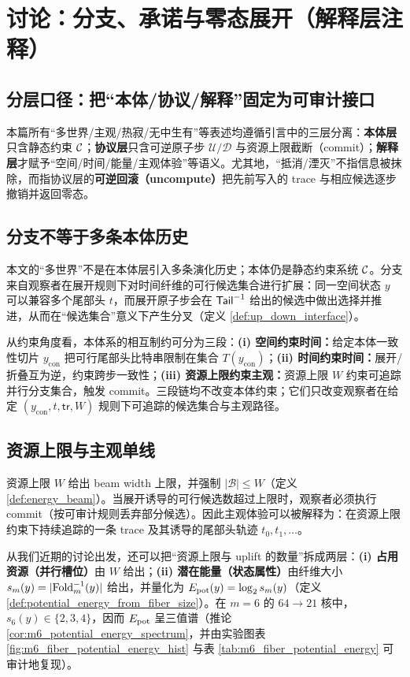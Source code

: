 \section{讨论：分支、承诺与零态展开（解释层注释）}

\subsection{分层口径：把“本体/协议/解释”固定为可审计接口}
本篇所有“多世界/主观/热寂/无中生有”等表述均遵循引言中的三层分离：\textbf{本体层}只含静态约束 \(\mathcal{C}\)；\textbf{协议层}只含可逆原子步 \(\mathcal U/\mathcal D\) 与资源上限截断（commit）；\textbf{解释层}才赋予“空间/时间/能量/主观体验”等语义。尤其地，“抵消/湮灭”不指信息被抹除，而指协议层的\textbf{可逆回滚（uncompute）}把先前写入的 trace 与相应候选逐步撤销并返回零态。

\subsection{分支不等于多条本体历史}
本文的“多世界”不是在本体层引入多条演化历史；本体仍是静态约束系统 \(\mathcal{C}\)。分支来自观察者在展开规则下对时间纤维的可行候选集合进行扩展：同一空间状态 \(y\) 可以兼容多个尾部头 \(t\)，而展开原子步会在 \(\mathsf{Tail}^{-1}\) 给出的候选中做出选择并推进，从而在“候选集合”意义下产生分叉（定义 \ref{def:up_down_interface}）。

\begin{remark}
从约束角度看，本体系的相互制约可分为三段：\textbf{(i) 空间约束时间：}给定本体一致性切片 \(y_{\mathrm{con}}\) 把可行尾部头比特串限制在集合 \(T(y_{\mathrm{con}})\)；\textbf{(ii) 时间约束时间：}展开/折叠互为逆，约束跨步一致性；\textbf{(iii) 资源上限约束主观：}资源上限 \(W\) 约束可追踪并行分支集合，触发 commit。三段链均不改变本体约束；它们只改变观察者在给定 \((y_{\mathrm{con}},t,\mathsf{tr},W)\) 规则下可追踪的候选集合与主观路径。
\end{remark}

\subsection{资源上限与主观单线}
资源上限 \(W\) 给出 beam width 上限，并强制 \(|\mathcal B|\le W\)（定义 \ref{def:energy_beam}）。当展开诱导的可行候选数超过上限时，观察者必须执行 commit（按可审计规则丢弃部分候选）。因此主观体验可以被解释为：在资源上限约束下持续追踪的一条 trace 及其诱导的尾部头轨迹 \(t_0,t_1,\dots\)。

从我们近期的讨论出发，还可以把“资源上限与 uplift 的数量”拆成两层：\textbf{(i) 占用资源（并行槽位）}由 \(W\) 给出；\textbf{(ii) 潜在能量（状态属性）}由纤维大小 \(s_m(y)=|\mathrm{Fold}_m^{-1}(y)|\) 给出，并量化为 \(E_{\mathrm{pot}}(y)=\log_2 s_m(y)\)（定义 \ref{def:potential_energy_from_fiber_size}）。在 \(m=6\) 的 \(64\to 21\) 核中，\(s_6(y)\in\{2,3,4\}\)，因而 \(E_{\mathrm{pot}}\) 呈三值谱（推论 \ref{cor:m6_potential_energy_spectrum}，并由实验图表 \ref{fig:m6_fiber_potential_energy_hist} 与表 \ref{tab:m6_fiber_potential_energy} 可审计地复现）。

